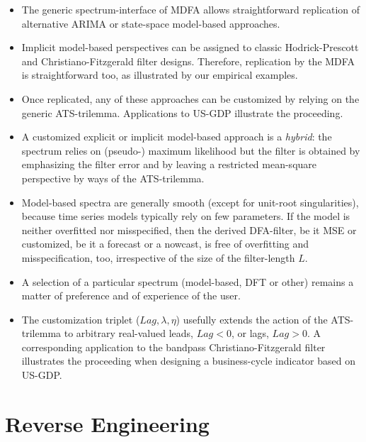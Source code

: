 \documentclass[a4paper]{book}
\begin{document}
\begin{itemize}
\item The generic spectrum-interface of MDFA allows straightforward replication of alternative ARIMA or state-space model-based approaches.
\item Implicit model-based perspectives can be assigned to classic Hodrick-Prescott and Christiano-Fitzgerald filter designs. Therefore, replication by the MDFA is straightforward too, as illustrated by our empirical examples. 
\item Once replicated, any of these approaches can be customized by relying on the generic ATS-trilemma. Applications to US-GDP illustrate the proceeding.
\item A customized explicit or implicit model-based approach is a \emph{hybrid}: the spectrum relies on (pseudo-) maximum likelihood but the filter is obtained by emphasizing the filter error and by leaving a restricted mean-square perspective by ways of the ATS-trilemma. 
\item Model-based spectra are generally smooth (except for unit-root singularities), because time series models typically rely on few parameters. If the model is neither overfitted nor misspecified, then the derived DFA-filter, be it MSE or customized, be it a forecast or a nowcast, is free of overfitting and misspecification, too, irrespective of the size of the filter-length $L$.  
\item A selection of a particular spectrum (model-based, DFT or other) remains a matter of preference and of experience of the user.
\item The customization triplet ($Lag,\lambda,\eta$) usefully extends the action of the ATS-trilemma to arbitrary  real-valued leads, $Lag<0$, or lags, $Lag>0$. A corresponding application to the bandpass Christiano-Fitzgerald filter illustrates the proceeding when designing a business-cycle indicator based on US-GDP.
\end{itemize}







\chapter{Reverse Engineering}\label{rev_eng}
\end{document}
